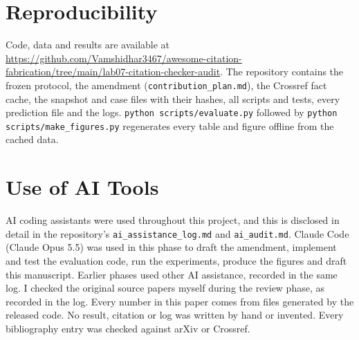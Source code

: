 \documentclass[acmsmall,screen,nonacm]{acmart}
\begin{document}
\section*{Reproducibility}
Code, data and results are available at \url{https://github.com/Vamshidhar3467/awesome-citation-fabrication/tree/main/lab07-citation-checker-audit}. The repository contains the frozen protocol, the amendment (\texttt{contribution\_plan.md}), the Crossref fact cache, the snapshot and case files with their hashes, all scripts and tests, every prediction file and the logs. \texttt{python scripts/evaluate.py} followed by \texttt{python scripts/make\_figures.py} regenerates every table and figure offline from the cached data.

\section*{Use of AI Tools}
AI coding assistants were used throughout this project, and this is disclosed in detail in the repository's \texttt{ai\_assistance\_log.md} and \texttt{ai\_audit.md}. Claude Code (Claude Opus 5.5) was used in this phase to draft the amendment, implement and test the evaluation code, run the experiments, produce the figures and draft this manuscript. Earlier phases used other AI assistance, recorded in the same log. I checked the original source papers myself during the review phase, as recorded in the log. Every number in this paper comes from files generated by the released code. No result, citation or log was written by hand or invented. Every bibliography entry was checked against arXiv or Crossref.



\end{document}
